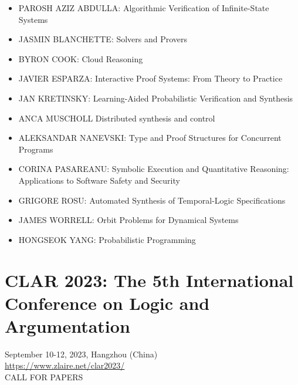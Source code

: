 \documentclass[prodmode,acmtecs]{acmsmall} %
\begin{document}
\begin{itemize}
\begin{itemize}\item  PAROSH AZIZ ABDULLA: Algorithmic Verification of Infinite-State Systems
\item  JASMIN BLANCHETTE: Solvers and Provers
\item  BYRON COOK: Cloud Reasoning
\item  JAVIER ESPARZA: Interactive Proof Systems: From Theory to Practice
\item  JAN KRETINSKY: Learning-Aided Probabilistic Verification and Synthesis
\item  ANCA MUSCHOLL Distributed synthesis and control
\item  ALEKSANDAR NANEVSKI: Type and Proof Structures for Concurrent Programs
\item  CORINA PASAREANU: Symbolic Execution and Quantitative Reasoning: Applications to Software Safety and Security
\item  GRIGORE ROSU: Automated Synthesis of Temporal-Logic Specifications
\item  JAMES WORRELL: Orbit Problems for Dynamical Systems
\item  HONGSEOK YANG: Probabilistic Programming 
\end{itemize} 
\end{itemize}\section{CLAR 2023: The 5th International Conference on Logic and Argumentation}\label{CLAR2023}  September 10-12, 2023, Hangzhou (China)\\ 
  \href{https://www.zlaire.net/clar2023/}{https://www.zlaire.net/clar2023/}\\ 
CALL FOR PAPERS 
\end{document}
